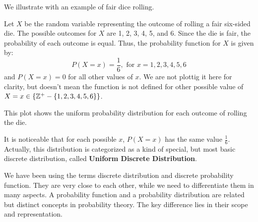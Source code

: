 We illustrate with an example of fair dice rolling.
\begin{example}
    Let \( X \) be the random variable representing the outcome of rolling a fair six-sided die. The possible outcomes for \( X \) are 1, 2, 3, 4, 5, and 6. Since the die is fair, the probability of each outcome is equal. Thus, the probability function for \( X \) is given by:
    \[
    P(X = x) = \frac{1}{6}, \text{ for } x = 1, 2, 3, 4, 5, 6
    \]
    and \( P(X = x) = 0 \) for all other values of \( x \). We are not plottig it here for clarity, but doesn't mean the function is not defined for other possible value of $X = x\in \{\mathbb{Z}^+ - \{1, 2, 3, 4, 5, 6\}\}$.

\begin{center}
\end{center}

    This plot shows the uniform probability distribution for each outcome of rolling the die.
\end{example}

It is noticeable that for each possible $x$, $P(X=x)$ has the same value $\frac{1}{6}$. 
Actually, this distribution is categorized as a kind of special, but most basic discrete distribution, called \textbf{Uniform Discrete Distribution}.

We have been using the terms discrete distribution and discrete probability function. They are very close to each other, while we need to differentiate them in many aspects.
A probability function and a probability distribution are related but distinct concepts in probability theory. The key difference lies in their scope and representation.

